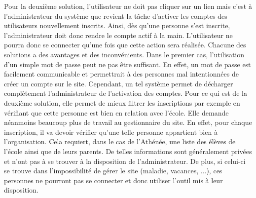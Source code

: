 \documentclass[12pt, a4paper, oneside]{article}
\begin{document}
    Pour la deuxième solution, l'utilisateur ne doit pas cliquer sur un lien mais c'est à l'administrateur du système que revient la tâche d'activer les comptes des utilisateurs nouvellement inscrits. Ainsi, dès qu'une personne s'est inscrite, l'administrateur doit donc rendre le compte actif à la main. L'utilisateur ne pourra donc se connecter qu'une fois que cette action sera réalisée. Chacune des solutions a des avantages et des inconvénients. Dans le premier cas, l'utilisation d'un simple mot de passe peut ne pas être suffisant. En effet, un mot de passe est facilement communicable et permettrait à des personnes mal intentionnées de créer un compte sur le site. Cependant, un tel système permet de décharger complètement l'administrateur de l'activation des comptes. Pour ce qui est de la deuxième solution, elle permet de mieux filtrer les inscriptions par exemple en vérifiant que cette personne est bien en relation avec l'école. Elle demande néanmoins beaucoup plus de travail au gestionnaire du site. En effet, pour chaque inscription, il va devoir vérifier qu'une telle personne appartient bien à l'organisation. Cela requiert, dans le cas de l'Athénée, une liste des élèves de l'école ainsi que de leurs parents. De telles informations sont généralement privées et n'ont pas à se trouver à la disposition de l'administrateur. De plus, si celui-ci se trouve dans l'impossibilité de gérer le site (maladie, vacances, ...), ces personnes ne pourront pas se connecter et donc utiliser l'outil mis à leur disposition. \\\\
\end{document}
